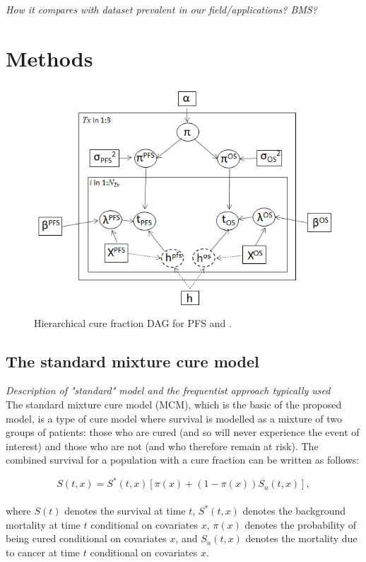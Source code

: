 \documentclass[AMA,STIX1COL]{WileyNJD-v2}
\begin{document}
{\it How it compares with dataset prevalent in our field/applications? BMS?}


\section{Methods}\label{sec:methods}

\begin{figure}
\centering
\includegraphics[width=0.6\linewidth]{DAG_with_Tx.png}
\caption{\label{fig:hier_dag} Hierarchical cure fraction DAG for PFS and .}
\end{figure}

\subsection{The standard mixture cure model} \label{section:basic_model}
{\it Description of "standard" model and the frequentist approach typically used}\\
The standard mixture cure model (MCM), which is the basic of the proposed model, is a type of cure model where survival is modelled as a mixture of two groups of patients: those who are cured (and so will never experience the event of interest) and those who are not (and who therefore remain at risk).
The combined survival for a population with a cure fraction can be written as follows:

\begin{equation}
\label{eqn:mcm}
S(t, x) = S^*(t, x) [\pi(x) + (1 - \pi(x)) S_u(t, x)],
\end{equation}
\\
\noindent
where $S(t)$ denotes the survival at time $t$, $S^*(t, x)$ denotes the background mortality
at time $t$ conditional on covariates $x$, $\pi(x)$ denotes the probability of being
cured conditional on covariates $x$, and $S_{u}(t, x)$ denotes the mortality due to 
cancer at time $t$ conditional on covariates $x$.
\end{document}
